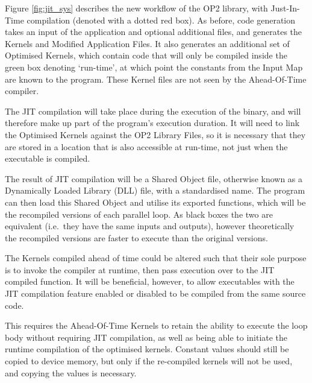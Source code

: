 \noindent Figure \ref{fig:jit_sys} describes the new workflow of the OP2 library, with Just-In-Time compilation (denoted with a dotted red box). As before, code generation takes an input of the application and optional additional files, and generates the Kernels and Modified Application Files. It also generates an additional set of Optimised Kernels, which contain code that will only be compiled inside the green box denoting `run-time', at which point the constants from the Input Map are known to the program. These Kernel files are not seen by the Ahead-Of-Time compiler.
\par
The JIT compilation will take place during the execution of the binary, and will therefore make up part of the program's execution duration. It will need to link the Optimised Kernels against the OP2 Library Files, so it is necessary that they are stored in a location that is also accessible at run-time, not just when the executable is compiled.
\par
The result of JIT compilation will be a Shared Object file, otherwise known as a Dynamically Loaded Library (DLL) file, with a standardised name. The program can then load this Shared Object and utilise its exported functions, which will be the recompiled versions of each parallel loop. As black boxes the two are equivalent (i.e.\ they have the same inputs and outputs), however theoretically the recompiled versions are faster to execute than the original versions.


\noindent The Kernels compiled ahead of time could be altered such that their sole purpose is to invoke the compiler at runtime, then pass execution over to the JIT compiled function. It will be beneficial, however, to allow executables with the JIT compilation feature enabled or disabled to be compiled from the same source code.
\par
This requires the Ahead-Of-Time Kernels to retain the ability to execute the loop body without requiring JIT compilation, as well as being able to initiate the runtime compilation of the optimised kernels. Constant values should still be copied to device memory, but only if the re-compiled kernels will not be used, and copying the values is necessary.
\clearpage
